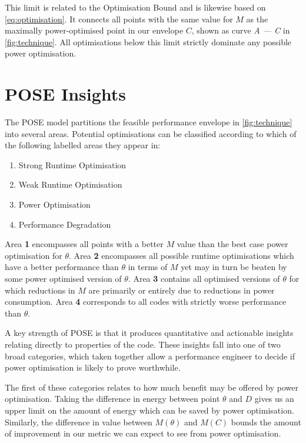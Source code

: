 This limit is related to the Optimisation Bound and is likewise based on \autoref{eq:optimisation}.
It connects all points with the same value for $M$ as the maximally power-optimised point in our envelope $C$, shown as curve \emph{A --- C} in \autoref{fig:technique}.
All optimisations below this limit strictly dominate any possible power optimisation.

\section{POSE Insights}
\label{sec:insights}
The POSE model partitions the feasible performance envelope in \autoref{fig:technique} into several areas.
Potential optimisations can be classified according to which of the following labelled areas they appear in:
\begin{multicols}{2}
\begin{enumerate}
\item Strong Runtime Optimisation
\item Weak Runtime Optimisation
\item Power Optimisation
\item Performance Degradation  
\end{enumerate}
\end{multicols}
Area \textbf{1} encompasses all points with a better $M$ value than the best case power optimisation for $\theta$.
Area \textbf{2} encompasses all possible runtime optimisations which have a better performance than $\theta$ in terms of $M$ yet may in turn be beaten by some power optimised version of $\theta$.
Area \textbf{3} contains all optimised versions of $\theta$ for which reductions in $M$ are primarily or entirely due to reductions in power consumption.
Area \textbf{4} corresponds to all codes with strictly worse performance than $\theta$.

A key strength of POSE is that it produces quantitative and actionable insights relating directly to properties of the code.
These insights fall into one of two broad categories, which taken together allow a performance engineer to decide if power optimisation is likely to prove worthwhile.

The first of these categories relates to how much benefit may be offered by power optimisation.
Taking the difference in energy between point $\theta$ and $D$ gives us an upper limit on the amount of energy which can be saved by power optimisation. 
Similarly, the difference in value between $M(\theta)$ and $M(C)$ bounds the amount of improvement in our metric we can expect to see from power optimisation.

